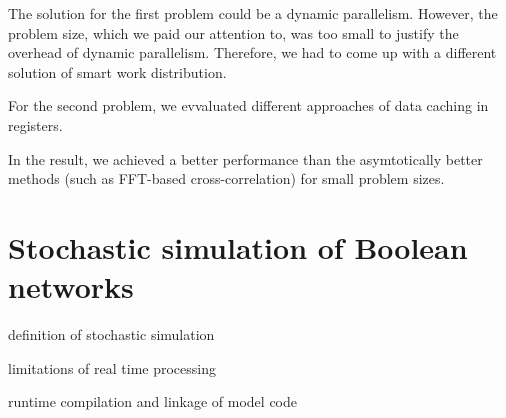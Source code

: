 The solution for the first problem could be a dynamic parallelism. However, the problem size, which we paid our attention to, was too small to justify the overhead of dynamic parallelism. Therefore, we had to come up with a different solution of smart work distribution.

For the second problem, we evvaluated different approaches of data caching in registers.

In the result, we achieved a better performance than the asymtotically better methods (such as FFT-based cross-correlation) for small problem sizes.

\section{Stochastic simulation of Boolean networks}

definition of stochastic simulation

limitations of real time processing

runtime compilation and linkage of model code